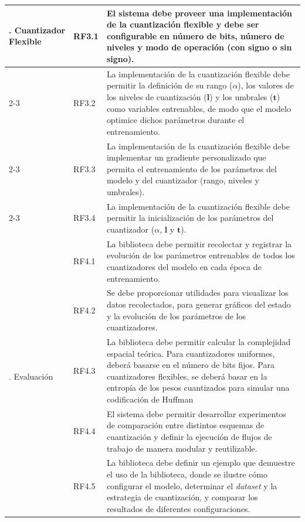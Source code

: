 \begin{longtable}{m{2.0cm} m{1.5cm} m{8.5cm}}
\multirow[c]{4}{2.0cm}{\centering 3. Cuantizador Flexible}
    & RF3.1 & El sistema debe proveer una implementación de la cuantización flexible y debe ser configurable en número de bits, número de niveles y modo de operación (con signo o sin signo). \\
    \cmidrule{2-3}
    & RF3.2 & La implementación de la cuantización flexible debe permitir la definición de su rango ($\alpha$), los valores de los niveles de cuantización ($\mathbf{l}$) y los umbrales ($\mathbf{t}$) como variables entrenables, de modo que el modelo optimice dichos parámetros durante el entrenamiento. \\
    \cmidrule{2-3}
    & RF3.3 & La implementación de la cuantización flexible debe implementar un gradiente personalizado que permita el entrenamiento de los parámetros del modelo y del cuantizador (rango, niveles y umbrales). \\
    \cmidrule{2-3}
    & RF3.4 & La implementación de la cuantización flexible debe permitir la inicialización de los parámetros del cuantizador ($\alpha$, $\mathbf{l}$ y $\mathbf{t}$). \\
\midrule

\multirow[c]{5}{2.0cm}{\centering 4. Evaluación}
    & RF4.1 & La biblioteca debe permitir recolectar y registrar la evolución de los parámetros entrenables de todos los cuantizadores del modelo en cada época de entrenamiento. \\
    \cmidrule{2-3}
    & RF4.2 & Se debe proporcionar utilidades para visualizar los datos recolectados, para generar gráficos del estado y la evolución de los parámetros de los cuantizadores. \\
    \cmidrule{2-3}
    & RF4.3 & La biblioteca debe permitir calcular la complejidad espacial teórica. Para cuantizadores uniformes, deberá basarse en el número de bits fijos. Para cuantizadores flexibles, se deberá basar en la entropía de los pesos cuantizados para simular una codificación de Huffman \cite{huffman1952method}  \\
    \cmidrule{2-3}
    & RF4.4 & El sistema debe permitir desarrollar experimentos de comparación entre distintos esquemas de cuantización y definir la ejecución de flujos de trabajo de manera modular y reutilizable. \\
    \cmidrule{2-3}
    & RF4.5 & La biblioteca debe definir un ejemplo que demuestre el uso de la biblioteca, donde se ilustre cómo configurar el modelo, determinar el \textit{dataset} y la estrategia de cuantización, y comparar los resultados de diferentes configuraciones. \\
\end{longtable}
